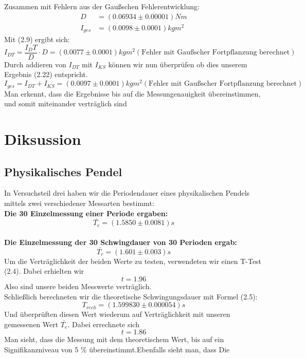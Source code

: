 \documentclass[11pt,a4paper]{article}
\begin{document}
	Zusammen mit Fehlern aus der Gaußschen Fehlerentwicklung:
	\begin{align}
	D&=(0.06934 \pm 0.00001) Nm \\
	I_{ges}&=(0.0098 \pm 0.0001)kgm^2
	\end{align}
	Mit (2.9) ergibt sich:
	\begin{equation}
	I_{DT}=\frac{I_DT}{D} \cdot D =(0.0077 \pm 0.0001)kgm^2 (\text{Fehler mit Gaußscher Fortpflanzung berechnet})
	\end{equation}
	\vspace{0.5 ex}Durch addieren von $I_{DT}$ mit $I_{KS}$ können wir nun überprüfen ob dies unserem Ergebnis (2.22)
	entspricht.
	\begin{equation}
	I_{ges}=I_{DT}+I_{KS}=(0.0097 \pm 0.0001)kgm^2 (\text{Fehler mit Gaußscher Fortpflanzung berechnet})
	\end{equation}
	Man erkennt, dass die Ergebnisse bis auf die Messungenauigkeit übereinstimmen, und somit miteinander verträglich sind
\newpage

\section{Diksussion}

	\subsection{Physikalisches Pendel}
	In Versuchsteil drei haben wir die Periodendauer eines physikalischen Pendels mittels
	zwei verschiedener Messarten bestimmt:\\
	{\bf Die 30 Einzelmessung einer Periode ergaben:}$$\bar{T_e}=(1.5850 \pm 0.0081)s$$\\
	{\bf Die Einzelmessung der 30 Schwingdauer von 30 Perioden ergab:} $$\bar{T_r}=(1.601\pm 0.003)s$$
	Um die Verträglichkeit der beiden Werte zu testen, verwendeten wir einen T-Test (2.4). Dabei erhielten wir $$t=1.96$$ Also sind unsere beiden Messwerte verträglich.
	\\ Schließlich berechneten wir die theoretische Schwingungsdauer mit Formel (2.5):
	$$T_{rech}=(1.599830\pm 0.000054)s$$
	Und überprüften diesen Wert wiederum auf Verträglichkeit mit unseren gemessenen Wert $\bar{T_e}$.
	Dabei errechnete sich 
	$$t=1.86$$
	Man sieht, dass die Messung mit dem theoretischem Wert, bis auf ein Signifikanzniveau von 5 \% übereinstimmt.Ebenfalls sieht man, dass Die 
	
	
	
\end{document}
